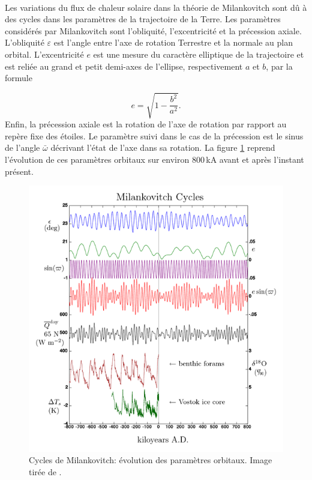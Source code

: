 
\paragraph{} Les variations du flux de chaleur solaire dans la théorie de Milankovitch sont dû à des cycles dans les paramètres de la trajectoire de la Terre. Les paramètres considérés par Milankovitch sont l'obliquité, l'excentricité et la précession axiale. L'obliquité $\varepsilon$ est l'angle entre l'axe de rotation Terrestre et la normale au plan orbital. L'excentricité $e$ est une mesure du caractère elliptique de la trajectoire et est reliée au grand et petit demi-axes de l'ellipse, respectivement $a$ et $b$, par la formule

\begin{equation}
	e = \sqrt{1-\frac{b^2}{a^2}}.
\end{equation}
Enfin, la précession axiale est la rotation de l'axe de rotation par rapport au repère fixe des étoiles. Le paramètre suivi dans le cas de la précession est le sinus de l'angle $\bar\omega$ décrivant l'état de l'axe dans sa rotation. La figure \ref{fig:MilankovitchCyclesOrbitandCores} reprend l'évolution de ces paramètres orbitaux sur environ 800\,kA avant et après l'instant présent.

\begin{figure}[t]
	\centering
	\includegraphics[width=0.9\linewidth]{figures/MilankovitchCyclesOrbitandCores}
	\caption{Cycles de Milankovitch: évolution des paramètres orbitaux. Image tirée de \cite{wiki_milankovitch_cycles}.}
	\label{fig:MilankovitchCyclesOrbitandCores}
\end{figure}

